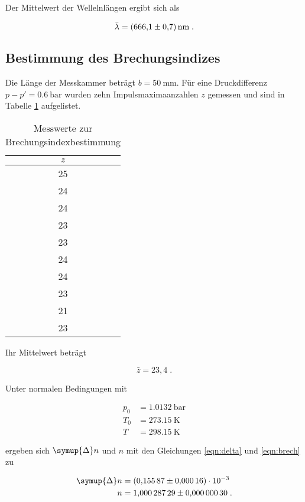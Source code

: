 Der Mittelwert der Wellelnlängen ergibt sich als

\begin{equation*}
    \bar{\lambda} = \SI{666.1 +- 0.7}{\nano\meter} \; .
\end{equation*}

\subsection{Bestimmung des Brechungsindizes}

Die Länge der Messkammer beträgt $b = \SI{50}{\milli\meter}$.
Für eine Druckdifferenz $p - p' = \SI{0.6}{\bar}$ wurden zehn Impulsmaximaanzahlen $z$ gemessen
und sind in Tabelle \ref{tab:mess2} aufgelistet.

\begin{table}
    \centering
    \caption{Messwerte zur Brechungsindexbestimmung}
    \label{tab:mess2}
    \begin{tabular}{c}
    \toprule
    $z$ \\
    \midrule 
        25\\
        24\\
        24\\
        23\\
        23\\
        24\\
        24\\
        23\\
        21\\
        23\\
    \bottomrule
    \end{tabular}
    \end{table}

Ihr Mittelwert beträgt

\begin{equation*}
    \bar{z} = 23,4 \; .
\end{equation*}

Unter normalen Bedingungen mit

\begin{align*}
    p_0 &= \SI{1.0132}{\bar} \\
    T_0 &= \SI{273.15}{\kelvin} \\
    T &= \SI{298.15}{\kelvin}
\end{align*}

ergeben sich $\symup{\Delta}n$ und $n$ mit den Gleichungen \eqref{eqn:delta} und \eqref{eqn:brech} zu

\begin{align*}
    \symup{\Delta}n &= (\num{0.15587 +- 0.00016}) \cdot 10^{-3} \\
    n &= \num{1.00028729 +- 0.00000030} \; .
\end{align*}





